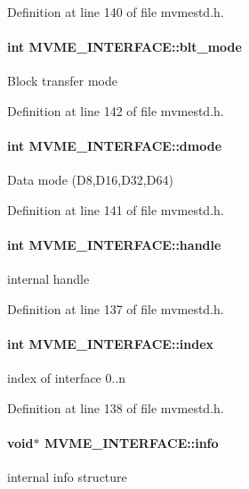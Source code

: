 Definition at line 140 of file mvmestd.h.
\paragraph[{blt\_\-mode}]{\setlength{\rightskip}{0pt plus 5cm}int {\bf MVME\_\-INTERFACE::blt\_\-mode}}\hfill\label{structMVME__INTERFACE_a3c4ed00734831ccec46d8ff73d98caea}
Block transfer mode 

Definition at line 142 of file mvmestd.h.
\paragraph[{dmode}]{\setlength{\rightskip}{0pt plus 5cm}int {\bf MVME\_\-INTERFACE::dmode}}\hfill\label{structMVME__INTERFACE_a229c5c54af3c138b88d219590c38cfe2}
Data mode (D8,D16,D32,D64) 

Definition at line 141 of file mvmestd.h.
\paragraph[{handle}]{\setlength{\rightskip}{0pt plus 5cm}int {\bf MVME\_\-INTERFACE::handle}}\hfill\label{structMVME__INTERFACE_a645e42193b88548a3148730b05b67c46}
internal handle 

Definition at line 137 of file mvmestd.h.
\paragraph[{index}]{\setlength{\rightskip}{0pt plus 5cm}int {\bf MVME\_\-INTERFACE::index}}\hfill\label{structMVME__INTERFACE_a474a77416b39c0ae244a29cf6055a9ac}
index of interface 0..n 

Definition at line 138 of file mvmestd.h.
\paragraph[{info}]{\setlength{\rightskip}{0pt plus 5cm}void$\ast$ {\bf MVME\_\-INTERFACE::info}}\hfill\label{structMVME__INTERFACE_a7fb4fc35204b1adc988c92ead0521b29}
internal info structure 

